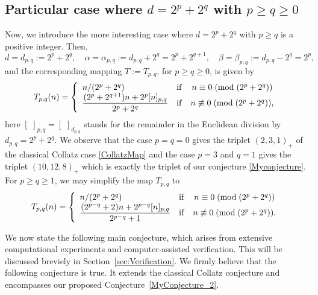 \documentclass[11pt,a4paper]{article}
\newcommand*\modd[3]{#1\equiv#2\;( {\rm mod}\;  #3)}
\newcommand*\notmodd[3]{#1\not\equiv#2\;( {\rm mod}\;  #3)}
\begin{document}
\subsection{Particular case where $d=2^p+2^q$ with $p\geq q\geq 0$}
Now, we introduce  the more interesting case where  $d=2^p+2^q$  with    $p\geq q$  is a positive integer. Then, 
\begin{equation}\label{parametersd_dp+dq}
	d=d_{p,q}:=2^p+2^q,\quad \alpha=\alpha_{p,q}:=d_{p,q}+2^q=2^p+2^{q+1}, \quad \beta=\beta_{p,q}:=d_{p,q}-2^q=2^p,
\end{equation}
and the 
corresponding mapping $T:=T_{p,q}$, for $p\geq q\geq 0$, is given  by
\begin{equation}\label{mapMainConjecture_dpdq}
	T_{p,q}(n)=\left\{\begin{array}{lcc}
		n/(2^p+2^q)&\mathrm{if}& \modd{n}{0}{(2^p+2^q)}\\
		\dfrac{(2^p+2^{q+1})n+2^p[ n]_{p,q}}{2^p+2^q}&\mathrm{if}& \notmodd{n}{0}{(2^p+2^q)},\\
	\end{array}\right.
\end{equation}
here $[\,\,]_{p,q}=[\,\,]_{d_{p,q}}$ stands for the remainder in the Euclidean division by $d_{p,q}=2^p+2^q$.   We observe
that the case  $p =q=0$  gives the triplet $(2,3,1)_+$  of   the classical Collatz case  \eqref{CollatzMap}   and the case $p=3$ and $q=1$ gives the triplet $(10,12,8)_+$ which is exactly the triplet of our conjecture \ref{Myconjecture}.   For  $p\geq q\geq 1$,  we may simplify the map $T_{p,q}$   to
\begin{equation}\label{mapMainConjecture_dpdq__Simplified}
	T_{p,q}(n)=\left\{\begin{array}{lcc}
		n/(2^p+2^q)&\mathrm{if}& \modd{n}{0}{(2^p+2^q)}\\
		\dfrac{(2^{p-q}+2)n+2^{p-q}[ n]_{p,q}}{2^{p-q}+1}&\mathrm{if}& \notmodd{n}{0}{(2^p+2^q)}.\\
	\end{array}\right.
\end{equation}

We now state the following main conjecture, which arises from extensive computational experiments and computer-assisted verification. This will be discussed breviely in Section~\ref{sec:Verification}. We firmly believe that the following conjecture is true. It extends the classical Collatz conjecture and encompasses our proposed Conjecture~\ref{MyConjecture_2}.
\end{document}
